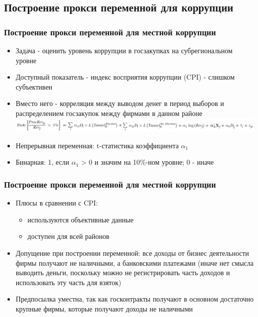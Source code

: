 \subsection{Построение прокси переменной для коррупции}

\begin{frame}
\frametitle{Построение прокси переменной для местной коррупции}
	\begin{itemize}
		\item Задача - оценить уровень коррупции в госзакупках на субрегиональном уровне
		\item Доступный показатель - индекс восприятия коррупции (CPI) - слишком субъективен
		\item Вместо него - корреляция между выводом денег в период выборов и распределением госзакупок
		 между фирмами в данном районе
		\includegraphics[scale=0.3]{images/kek1}
		\item Непрерывная переменная: t-статистика коэффициента $\alpha_1$
		\item Бинарная: 1, если $\alpha_1$ > 0 и значим на 10\%-ном уровне; 0 - иначе
	\end{itemize}
\end{frame}


\begin{frame}
\frametitle{Построение прокси переменной для местной коррупции}
	\begin{itemize}
		\item Плюсы в сравнении с CPI: 
		\begin{itemize}
			\item используются объективные данные
			\item доступен для всей районов
		\end{itemize} 
		\item Допущение при построении переменной: все доходы от бизнес деятельности фирмы получают не наличными, а банковскими платежами (иначе нет смысла выводить деньги, поскольку можно не регистрировать часть доходов и использовать эту часть для взяток)
		\item Предпосылка уместна, так как госконтракты получают в основном достаточно крупные фирмы, которые получают доходы не наличными 
	\end{itemize}
\end{frame}

